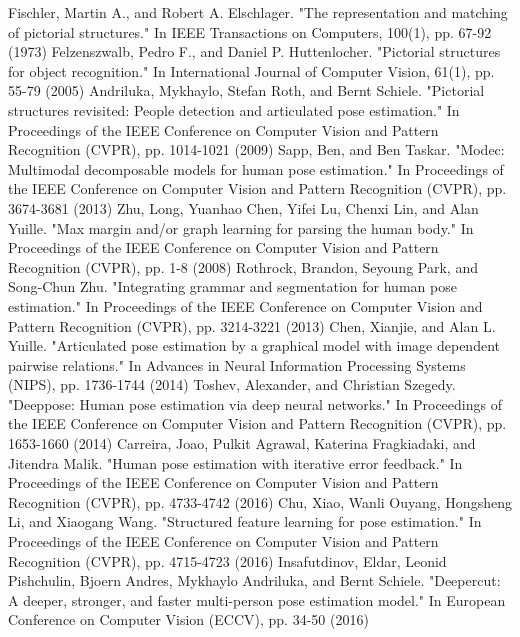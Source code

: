 \begin{thebibliography}{}
Fischler, Martin A., and Robert A. Elschlager. "The representation and matching of pictorial structures." In IEEE Transactions on Computers, 100(1), pp. 67-92 (1973)
Felzenszwalb, Pedro F., and Daniel P. Huttenlocher. "Pictorial structures for object recognition." In International Journal of Computer Vision, 61(1), pp. 55-79 (2005)
Andriluka, Mykhaylo, Stefan Roth, and Bernt Schiele. "Pictorial structures revisited: People detection and articulated pose estimation." In Proceedings of the IEEE Conference on Computer Vision and Pattern Recognition (CVPR), pp. 1014-1021 (2009)
Sapp, Ben, and Ben Taskar. "Modec: Multimodal decomposable models for human pose estimation." In Proceedings of the IEEE Conference on Computer Vision and Pattern Recognition (CVPR), pp. 3674-3681 (2013)
Zhu, Long, Yuanhao Chen, Yifei Lu, Chenxi Lin, and Alan Yuille. "Max margin and/or graph learning for parsing the human body." In Proceedings of the IEEE Conference on Computer Vision and Pattern Recognition (CVPR), pp. 1-8 (2008)
Rothrock, Brandon, Seyoung Park, and Song-Chun Zhu. "Integrating grammar and segmentation for human pose estimation." In Proceedings of the IEEE Conference on Computer Vision and Pattern Recognition (CVPR), pp. 3214-3221 (2013)
Chen, Xianjie, and Alan L. Yuille. "Articulated pose estimation by a graphical model with image dependent pairwise relations." In Advances in Neural Information Processing Systems (NIPS), pp. 1736-1744 (2014)
Toshev, Alexander, and Christian Szegedy. "Deeppose: Human pose estimation via deep neural networks." In Proceedings of the IEEE Conference on Computer Vision and Pattern Recognition (CVPR), pp. 1653-1660 (2014)
Carreira, Joao, Pulkit Agrawal, Katerina Fragkiadaki, and Jitendra Malik. "Human pose estimation with iterative error feedback." In Proceedings of the IEEE Conference on Computer Vision and Pattern Recognition (CVPR), pp. 4733-4742 (2016)
Chu, Xiao, Wanli Ouyang, Hongsheng Li, and Xiaogang Wang. "Structured feature learning for pose estimation." In Proceedings of the IEEE Conference on Computer Vision and Pattern Recognition (CVPR), pp. 4715-4723 (2016)
Insafutdinov, Eldar, Leonid Pishchulin, Bjoern Andres, Mykhaylo Andriluka, and Bernt Schiele. "Deepercut: A deeper, stronger, and faster multi-person pose estimation model." In European Conference on Computer Vision (ECCV), pp. 34-50 (2016)

\end{thebibliography}
